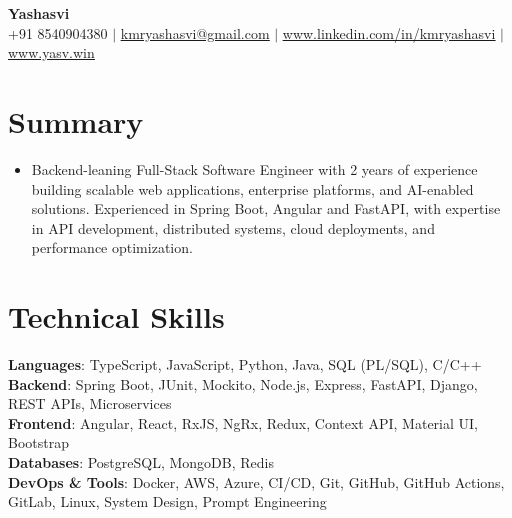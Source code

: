 \documentclass[letterpaper,11pt]{article}
\newcommand{\resumeItem}[1]{\item\small{{#1 \vspace{-2pt}}}}
\newcommand{\resumeSubHeadingListStart}{\begin{itemize}[leftmargin=0.0in, label={}]}
\newcommand{\resumeSubHeadingListEnd}{\end{itemize}}
\begin{document}
\begin{center}
    {\Huge\bfseries Yashasvi} \\ \vspace{4pt}
    \small
    +91 8540904380
    \hspace{0.2em}
    $|$
    \hspace{0.2em}
    \href{mailto:kmryashasvi@gmail.com}{\underline{kmryashasvi@gmail.com}}
    \hspace{0.2em}
    $|$
    \hspace{0.2em}
    \href{https://www.linkedin.com/in/kmryashasvi}{\underline{www.linkedin.com/in/kmryashasvi}}
    \hspace{0.2em}
    $|$
    \hspace{0.2em}
    \href{https://yasv.win}{\underline{www.yasv.win}}
\end{center}

\section{Summary}
\resumeSubHeadingListStart
\resumeItem{Backend-leaning Full-Stack Software Engineer with 2 years of experience building scalable web applications, enterprise platforms, and AI-enabled solutions. Experienced in Spring Boot, Angular and FastAPI, with expertise in API development, distributed systems, cloud deployments, and performance optimization.}
\resumeSubHeadingListEnd
\vspace{-15pt}

\section{Technical Skills}
\begin{itemize}[leftmargin=0.0in, label={}, itemsep=0pt, topsep=2pt]
\small{\item{
\textbf{Languages}{: TypeScript, JavaScript, Python, Java, SQL (PL/SQL), C/C++} \\
\textbf{Backend}{: Spring Boot, JUnit, Mockito, Node.js, Express, FastAPI, Django, REST APIs, Microservices} \\
\textbf{Frontend}{: Angular, React, RxJS, NgRx, Redux, Context API, Material UI, Bootstrap} \\
\textbf{Databases}{: PostgreSQL, MongoDB, Redis} \\
\textbf{DevOps \& Tools}{: Docker, AWS, Azure, CI/CD, Git, GitHub, GitHub Actions, GitLab, Linux, System Design, Prompt Engineering}
}}
\end{itemize}
\vspace{-11pt}
\end{document}
